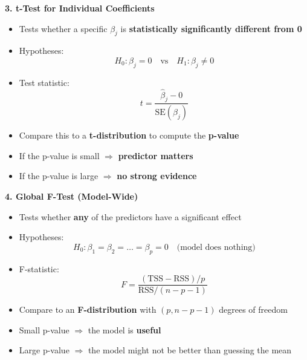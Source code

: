 \highspace
\begin{flushleft}
    \textcolor{Green3}{ \textbf{3. t-Test for Individual Coefficients}}
\end{flushleft}
\begin{itemize}
    \item Tests whether a specific $\beta_j$ is \textbf{statistically significantly different from 0}
    \item Hypotheses:
    \begin{equation*}
        H_0: \beta_j = 0 \quad \text{vs} \quad H_1: \beta_j \ne 0
    \end{equation*}
    \item Test statistic:
    \begin{equation*}
        t = \frac{\hat{\beta}_j - 0}{\text{SE}\left(\hat{\beta}_j\right)}
    \end{equation*}
    \item Compare this to a \textbf{t-distribution} to compute the \textbf{p-value}
    \item[\textcolor{Green3}{\faIcon{check-circle}}] If the p-value is small $\Rightarrow$ \textbf{predictor matters}
    \item[\textcolor{Red2}{\faIcon{times-circle}}] If the p-value is large $\Rightarrow$ \textbf{no strong evidence}
\end{itemize}

\highspace
\begin{flushleft}
    \textcolor{Green3}{ \textbf{4. Global F-Test (Model-Wide)}}
\end{flushleft}
\begin{itemize}
    \item Tests whether \textbf{any} of the predictors have a significant effect
    \item Hypotheses:
    \begin{equation*}
        H_0: \beta_1 = \beta_2 = \dots = \beta_p = 0 \quad \text{(model does nothing)}
    \end{equation*}
    \item F-statistic:
    \begin{equation*}
        F = \frac{(\text{TSS} - \text{RSS}) / p}{\text{RSS} / (n - p - 1)}
    \end{equation*}
    \item Compare to an \textbf{F-distribution} with $\left(p, n - p - 1\right)$ degrees of freedom
    \item[\textcolor{Green3}{\faIcon{check-circle}}] Small p-value $\Rightarrow$ the model is \textbf{useful}
    \item[\textcolor{Red2}{\faIcon{times-circle}}] Large p-value $\Rightarrow$ the model might not be better than guessing the mean
\end{itemize}

